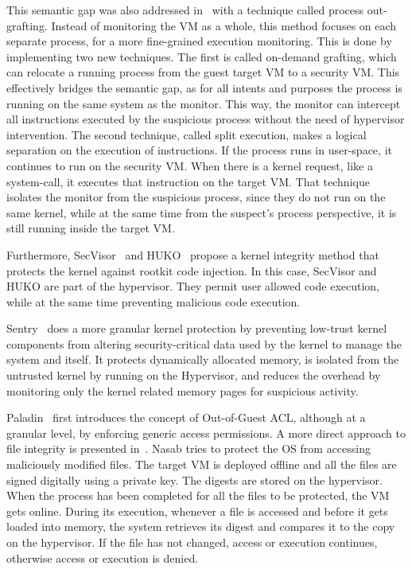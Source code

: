 \par This semantic gap was also addressed in~\cite{srinivasan2011process} with a technique called process out-grafting. Instead of monitoring the \ac{VM} as a whole, this method focuses on each separate process, for a more fine-grained execution monitoring. This is done by implementing two new techniques. The first is called on-demand grafting, which can relocate a running process from the guest target \ac{VM} to a security \ac{VM}. This effectively bridges the semantic gap, as for all intents and purposes the process is running on the same system as the monitor. This way, the monitor can intercept all instructions executed by the suspicious process without the need of hypervisor intervention. The second technique, called split execution, makes a logical separation on the execution of instructions. If the process runs in user-space, it continues to run on the security \ac{VM}. When there is a kernel request, like a system-call, it executes that instruction on the target \ac{VM}. That technique isolates the monitor from the suspicious process, since they do not run on the same kernel, while at the same time from the suspect’s process perspective, it is still running inside the target \ac{VM}. 

\par Furthermore, SecVisor~\cite{seshadri2007secvisor} and HUKO~\cite{xiong2011practical} propose a kernel integrity method that protects the kernel against rootkit code injection. In this case, SecVisor and HUKO are part of the hypervisor. They permit user allowed code execution, while at the same time preventing malicious code execution.


\par Sentry~\cite{srivastava2012efficient} does a more granular kernel protection by preventing low-trust kernel components from altering security-critical data used by the kernel to manage the system and itself. It protects dynamically allocated memory, is isolated from the untrusted kernel by running on the Hypervisor, and reduces the overhead by monitoring only the kernel related memory pages for suspicious activity.


\par Paladin~\cite{baliga2008automated} first introduces the concept of Out-of-Guest \ac{ACL}, although at a granular level, by enforcing generic access permissions. A more direct approach to file integrity is presented in~\cite{nasab2012security}. Nasab tries to protect the \ac{OS} from accessing maliciously modified files. The target \ac{VM} is deployed offline and all the files are signed digitally using a private key. The digests are stored on the hypervisor. When the process has been completed for all the files to be protected, the \ac{VM} gets online. During its execution, whenever a file is accessed and before it gets loaded into memory, the system retrieves its digest and compares it to the copy on the hypervisor. If the file has not changed, access or execution continues, otherwise access or execution is denied.

